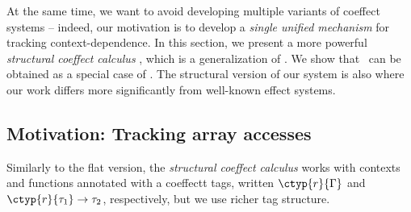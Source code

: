 At the same time, we want to avoid developing multiple variants of coeffect systems -- indeed, 
our motivation is to develop a \emph{single unified mechanism} for tracking context-dependence.
In this section, we present a more powerful \emph{structural coeffect calculus} \clstr, which is a 
generalization of \clflt. We show that \clflt~can be obtained as a special case of \clstr. The
structural version of our system is also where our work differs more significantly from well-known
effect systems. 


\subsection{Motivation: Tracking array accesses}
\label{sec:structural-motivation}

Similarly to the flat version, the \emph{structural coeffect calculus} works with contexts and
functions annotated with a coeffectt tags, written $\ctyp{r}{\Gamma}$ and $\ctyp{r}{\tau_1} \rightarrow \tau_2$, 
respectively, but we use richer tag structure.

